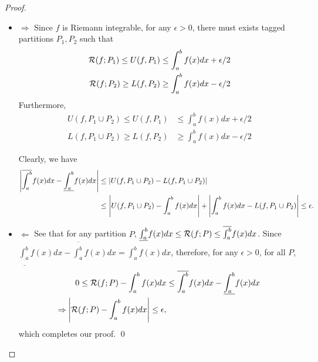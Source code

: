 \documentclass[11pt]{article}
\begin{document}
\begin{itemize}
\begin{proof}
\begin{itemize}
\item $\Rightarrow$  Since $f$ is Riemann integrable, for any $\epsilon>0$, there must exists tagged partitions $P_{1}, P_{2}$ such that 
\begin{align*}
{\mathcal R}(f ; P_{1}) \le U(f,P_{1})&\le  \int_{a}^{b}f(x)dx + \epsilon/2\\
{\mathcal R}(f ; P_{2}) \ge L(f,P_{2})&\ge  \int_{a}^{b}f(x)dx - \epsilon/2
\end{align*} 
Furthermore, 
\begin{align*}
 U(f, P_{1}\cup P_{2})\le U(f,P_{1})&\le  \int_{a}^{b}f(x)dx + \epsilon/2\\
L(f, P_{1}\cup P_{2}) \ge L(f,P_{2})&\ge  \int_{a}^{b}f(x)dx - \epsilon/2
\end{align*}


Clearly, we have
\begin{align*}
\left\lvert  \overline{\int_{a}^{b}}f(x)dx- \underline{\int_{a}^{b}}f(x)dx \right\rvert &\le \left\lvert U(f, P_{1}\cup P_{2}) -  L(f, P_{1}\cup P_{2})   \right\rvert\\
&\le \left\lvert U(f, P_{1}\cup P_{2}) - \int_{a}^{b}f(x)dx \right\rvert+ \left\lvert  \int_{a}^{b}f(x)dx - L(f, P_{1}\cup P_{2}) \right\rvert \le \epsilon.
\end{align*}

\item $\Leftarrow$ See that for any partition $P$, $\underline{\int_{a}^{b}}f(x)dx \le{\mathcal R}(f ; P) \le \overline{\int_{a}^{b}}f(x)dx$.  Since $\underline{\int_{a}^{b}}f(x)dx - \overline{\int_{a}^{b}}f(x)dx  = \int_{a}^{b}f(x)dx$, therefore,  for any $\epsilon>0$, for all $P$, 
\begin{align*}
 0\le  {\mathcal R}(f ; P)- \int_{a}^{b}f(x)dx &\le  \overline{\int_{a}^{b}}f(x)dx-  \underline{\int_{a}^{b}}f(x)dx\\
\Rightarrow  \left\lvert  {\mathcal R}(f ; P)- \int_{a}^{b}f(x)dx \right\rvert \le \epsilon,
\end{align*}
which completes our proof. \qed
\end{itemize}
\end{proof}
\end{itemize}
\end{document}
